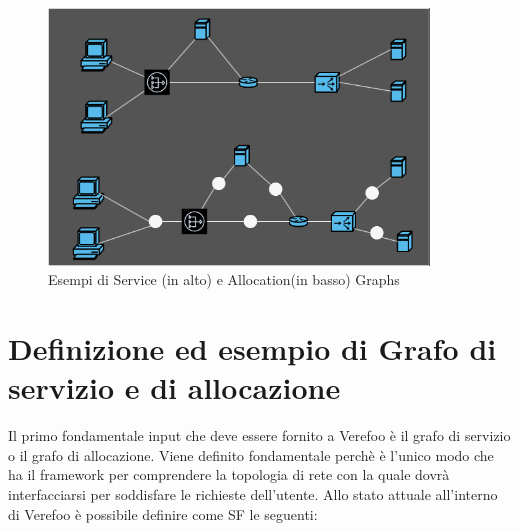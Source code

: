 \begin{figure}[H]  %
    \centering
    \includegraphics[width=0.9\textwidth]{Service_Allocation_Graph.png}  %
    \caption{Esempi di Service (in alto) e Allocation(in basso) Graphs \cite{Bringhenti2019}}
    \label{fig:AllocationGraph}
  \end{figure}



\section{Definizione ed esempio di Grafo di servizio e di allocazione}

Il primo fondamentale input che deve essere fornito a Verefoo è il grafo di servizio o il grafo di allocazione. 
Viene definito fondamentale perchè è l'unico modo che ha il framework per comprendere la topologia di rete con la quale dovrà interfacciarsi per soddisfare le richieste dell'utente.
Allo stato attuale all'interno di Verefoo è possibile definire come SF le seguenti:

